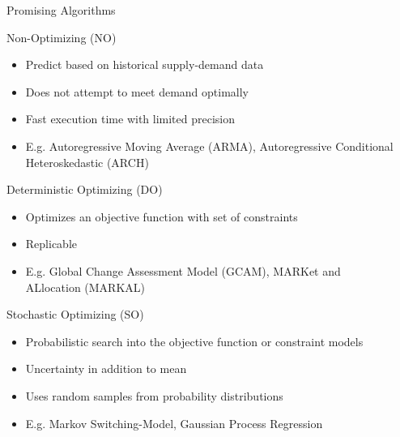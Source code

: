 \documentclass[final]{beamer}
\newlength{\sepwid}
\newlength{\onecolwid}
\newlength{\threecolwid}
\begin{document}
\begin{frame}[t]
\begin{columns}[t,totalwidth=\threecolwid]
\begin{column}{\sepwid}\end{column} %



\begin{column}{\onecolwid} %



\begin{block}{Promising Algorithms}\end{block}

        \begin{alertblock}{Non-Optimizing (NO)}
	\begin{itemize}
		\item {\large Predict based on historical supply-demand data}
		\item{\large  Does not attempt to meet demand optimally}
		\item {\large Fast execution time with limited precision}
		\item {\large E.g. Autoregressive Moving Average (ARMA), Autoregressive Conditional Heteroskedastic (ARCH)}
	\end{itemize}
        \end{alertblock}
        
        \begin{alertblock}{Deterministic Optimizing (DO)}
	\begin{itemize}
		\item{\large  Optimizes an objective function with set of constraints}
		\item {\large Replicable}
		\item{\large  E.g. Global Change Assessment Model (GCAM), MARKet and ALlocation (MARKAL)}
	\end{itemize}
        \end{alertblock}

        \begin{alertblock}{Stochastic Optimizing (SO)}
	\begin{itemize}
		\item {\large Probabilistic search into the objective function or constraint models}
		\item {\large Uncertainty in addition to mean}
		\item {\large Uses random samples from probability distributions}
		\item {\large E.g. Markov Switching-Model, Gaussian Process Regression}
	\end{itemize}
        \end{alertblock}


\end{column}
\end{columns}
\end{frame}
\end{document}
